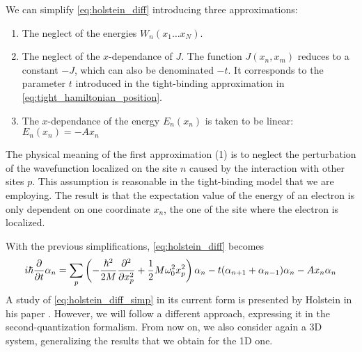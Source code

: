We can simplify \cref{eq:holstein_diff} introducing three approximations:
\begin{enumerate}
    \item The neglect of the energies $ W_n(x_1 \dots x_N)$.
    \item The neglect of the $x$-dependance of $J$. The function $J(x_n, x_m)$ reduces to a constant $-J$, which can also be denominated $-t$. It corresponds to the parameter $t$ introduced in the tight-binding approximation in \cref{eq:tight_hamiltonian_position}.
    \item The $x$-dependance of the energy $E_n(x_n)$ is taken to be linear: $    E_n(x_n) = - A x_n$
\end{enumerate}
The physical meaning of the first approximation (1) is to neglect the perturbation of the wavefunction localized on the site $n$ caused by the interaction with other sites $p$. This assumption is reasonable in the tight-binding model that we are employing. The result is that the expectation value of the energy of an electron is only dependent on one coordinate $x_n$, the one of the site where the electron is localized.

With the previous simplifications, \cref{eq:holstein_diff} becomes
\begin{equation} \label{eq:holstein_diff_simp}
    i\hbar\pdv{}{t} \alpha_n = \sum_p\left( -\frac{\hbar^2}{2M} \pdv[2]{}{x_p} + \frac{1}{2} M \omega_0^2 x_p^2 \right) \alpha_n - t (\alpha_{n+1}+\alpha_{n-1})\alpha_n
    - A x_n \alpha_n
\end{equation}
A study of \cref{eq:holstein_diff_simp} in its current form is presented by Holstein in his paper \cite{holstein1959}. However, we will follow a different approach, expressing it in the second-quantization formalism. From now on, we also consider again a 3D system, generalizing the results that we obtain for the 1D one.

